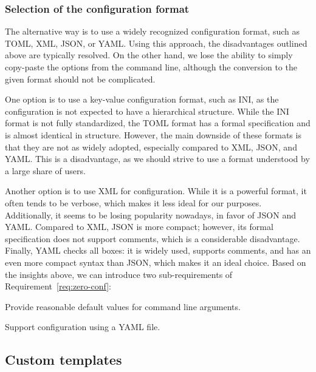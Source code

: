 \subsubsection*{Selection of the configuration format}

The alternative way is to use a widely recognized configuration format, such as TOML, XML, JSON, or YAML. 
Using this approach, the disadvantages outlined above are typically resolved.
On the other hand, we lose the ability to simply copy-paste the options from the command line, although the conversion to the given format should not be complicated.

One option is to use a key-value configuration format, such as INI, as the configuration is not expected to have a hierarchical structure.
While the INI format is not fully standardized, the TOML format has a formal specification and is almost identical in structure.
However, the main downside of these formats is that they are not as widely adopted, especially compared to  XML, JSON, and YAML.
This is a disadvantage, as we should strive to use a format understood by a large share of users.

Another option is to use XML for configuration. While it is a powerful format, it often tends to be verbose, which makes it less ideal for our purposes.
Additionally, it seems to be losing popularity nowadays, in favor of JSON and YAML.
Compared to XML, JSON is more compact; however, its formal specification does not support comments, which is a considerable disadvantage.
Finally, YAML checks all boxes: it is widely used, supports comments, and has an even more compact syntax than JSON, which makes it an ideal choice. 
Based on the insights above, we can introduce two sub-requirements of Requirement~\ref{req:zero-conf}:

\setcounter{subrequirementcounter}{1}
\begin{subrequirement}
    Provide reasonable default values for command line arguments.
    \label{subreq:config-default-values}
\end{subrequirement}

\begin{subrequirement}
    Support configuration using a YAML file.
    \label{subreq:config-yaml}
\end{subrequirement}

\subsection*{Custom templates}

